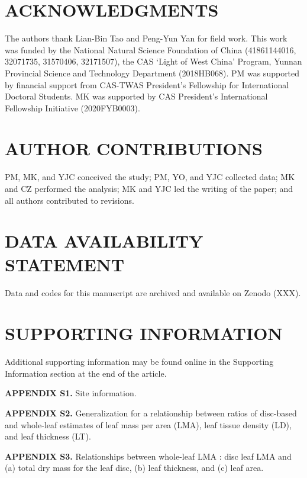 \documentclass[
  12pt,
  a4paper,
,tablecaptionabove
]{scrartcl}
\begin{document}
\hypertarget{acknowledgments}{%
\section{ACKNOWLEDGMENTS}\label{acknowledgments}}

The authors thank Lian-Bin Tao and Peng-Yun Yan for field work.
This work was funded by the National Natural Science Foundation of China (41861144016, 32071735, 31570406, 32171507), the CAS `Light of West China' Program, Yunnan Provincial Science and Technology Department (2018HB068).
PM was supported by financial support from CAS-TWAS President's Fellowship for International Doctoral Students.
MK was supported by CAS President's International Fellowship Initiative (2020FYB0003).

\hypertarget{author-contributions}{%
\section{AUTHOR CONTRIBUTIONS}\label{author-contributions}}

PM, MK, and YJC conceived the study;
PM, YO, and YJC collected data;
MK and CZ performed the analysis;
MK and YJC led the writing of the paper; and
all authors contributed to revisions.

\hypertarget{data-availability-statement}{%
\section{DATA AVAILABILITY STATEMENT}\label{data-availability-statement}}

Data and codes for this manuscript are archived and available on Zenodo (XXX).

\hypertarget{supporting-information}{%
\section{SUPPORTING INFORMATION}\label{supporting-information}}

Additional supporting information may be found online in the Supporting Information section at the end of the article.

\textbf{APPENDIX S1.}
Site information.

\textbf{APPENDIX S2.}
Generalization for a relationship between ratios of disc-based and whole-leaf estimates of leaf mass per area (LMA), leaf tissue density (LD), and leaf thickness (LT).

\textbf{APPENDIX S3.}
Relationships between whole-leaf LMA : disc leaf LMA and (a) total dry mass for the leaf disc, (b) leaf thickness, and (c) leaf area.
\end{document}
